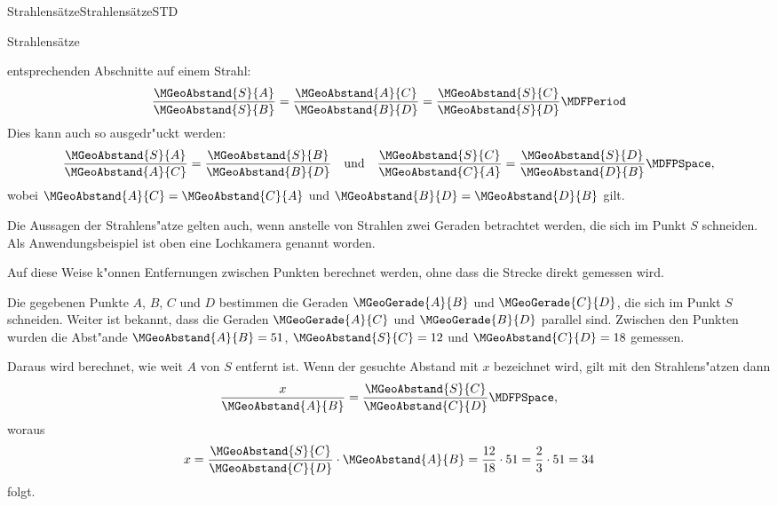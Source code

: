 \begin{MXContent}{Strahlens\"atze}{Strahlens\"atze}{STD}
\begin{MXInfo}{Strahlens\"atze}
\begin{itemize}
entsprechenden Abschnitte auf einem Strahl:
\[
   \frac{\MGeoAbstand{S}{A}}{\MGeoAbstand{S}{B}}
 = \frac{\MGeoAbstand{A}{C}}{\MGeoAbstand{B}{D}}
 = \frac{\MGeoAbstand{S}{C}}{\MGeoAbstand{S}{D}} \MDFPeriod
\]
Dies kann auch so ausgedr"uckt werden:
\[
   \frac{\MGeoAbstand{S}{A}}{\MGeoAbstand{A}{C}}
 = \frac{\MGeoAbstand{S}{B}}{\MGeoAbstand{B}{D}}
\quad\text{und}\quad
   \frac{\MGeoAbstand{S}{C}}{\MGeoAbstand{C}{A}}
 = \frac{\MGeoAbstand{S}{D}}{\MGeoAbstand{D}{B}} \MDFPSpace,
\]
wobei $\MGeoAbstand{A}{C} = \MGeoAbstand{C}{A}$
und $\MGeoAbstand{B}{D} = \MGeoAbstand{D}{B}$ gilt.
\end{itemize}
\end{MXInfo}
Die Aussagen der Strahlens"atze gelten auch, wenn anstelle von Strahlen 
zwei Geraden betrachtet werden, die sich im Punkt $S$ schneiden. Als 
Anwendungsbeispiel ist oben eine Lochkamera genannt worden.

Auf diese Weise k"onnen Entfernungen zwischen Punkten berechnet werden,
ohne dass die Strecke direkt gemessen wird.

\begin{MExample}
Die gegebenen Punkte $A$, $B$, $C$ und $D$ bestimmen die Geraden 
$\MGeoGerade{A}{B}$ und $\MGeoGerade{C}{D}$, die sich im Punkt $S$
schneiden. Weiter ist bekannt, dass die Geraden $\MGeoGerade{A}{C}$ und 
$\MGeoGerade{B}{D}$ parallel sind. Zwischen den Punkten wurden die 
Abst"ande $\MGeoAbstand{A}{B} = 51$, $\MGeoAbstand{S}{C} = 12 $ und 
$\MGeoAbstand{C}{D} = 18$ gemessen.

\begin{center}
\end{center}

Daraus wird berechnet, wie weit $A$ von $S$ entfernt ist. Wenn der gesuchte
Abstand mit $x$ bezeichnet wird, gilt mit den Strahlens"atzen dann
\[
   \frac{x}{\MGeoAbstand{A}{B}}
 = \frac{\MGeoAbstand{S}{C}}{\MGeoAbstand{C}{D}} \MDFPSpace,
\]
woraus
\[
x = \frac{\MGeoAbstand{S}{C}}{\MGeoAbstand{C}{D}} \cdot \MGeoAbstand{A}{B} %
 = \frac{12}{18} \cdot 51 = \frac{2}{3} \cdot 51 = 34 %
\]
folgt.
\end{MExample}
\end{MXContent}


